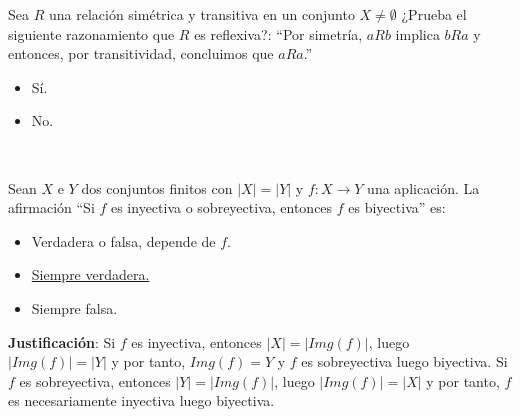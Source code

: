 \begin{ejercicio}
    Sea $R$ una relación simétrica y transitiva en un conjunto $X \neq \emptyset$ ¿Prueba el siguiente razonamiento que $R$ es reflexiva?:\newline
    ``Por simetría, $aRb$ implica $bRa$ y entonces, por transitividad, concluimos que $aRa$.''
    \begin{itemize}
        \item Sí.
        \item No.
    \end{itemize}
\end{ejercicio}

\newpage
\ %
\resetearcontador

\begin{ejercicio}
    Sean $X$ e $Y$ dos conjuntos finitos con $|X| = |Y|$ y $f:X \rightarrow Y$ una aplicación. La afirmación ``Si $f$ es inyectiva o sobreyectiva, entonces $f$ es biyectiva'' es:
    \begin{itemize}
        \item Verdadera o falsa, depende de $f$.
        \item \underline{Siempre verdadera.}
        \item Siempre falsa.
    \end{itemize}

    \noindent
    \textbf{Justificación}:
    Si $f$ es inyectiva, entonces $|X| = |Img(f)|$, luego $|Img(f)| = |Y|$ y por tanto, $Img(f) = Y$ y $f$ es sobreyectiva luego biyectiva.\newline
    Si $f$ es sobreyectiva, entonces $|Y|=|Img(f)|$, luego $|Img(f)| = |X|$ y por tanto, $f$ es necesariamente inyectiva luego biyectiva.
\end{ejercicio}


